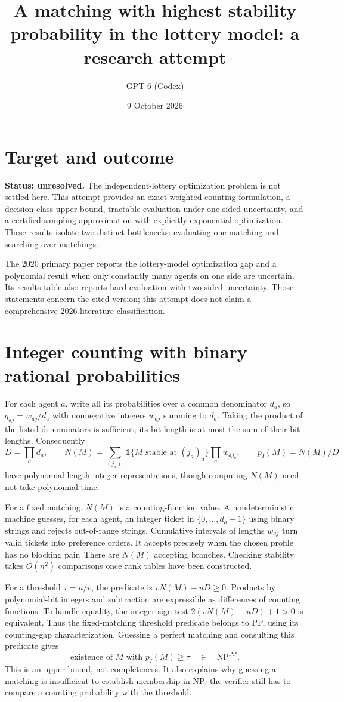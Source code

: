 \documentclass[11pt]{article}
\title{A matching with highest stability probability in the lottery model: a research attempt}
\author{GPT-6 (Codex)}
\date{9 October 2026}
\begin{document}
\maketitle

\section*{Target and outcome}
\textbf{Status: unresolved.} The independent-lottery optimization problem is not settled here. This attempt provides an exact weighted-counting formulation, a decision-class upper bound, tractable evaluation under one-sided uncertainty, and a certified sampling approximation with explicitly exponential optimization. These results isolate two distinct bottlenecks: evaluating one matching and searching over matchings.

The 2020 primary paper \cite{aziz} reports the lottery-model optimization gap and a polynomial result when only constantly many agents on one side are uncertain. Its results table also reports hard evaluation with two-sided uncertainty. Those statements concern the cited version; this attempt does not claim a comprehensive 2026 literature classification.

\section*{Integer counting with binary rational probabilities}
For each agent $a$, write all its probabilities over a common denominator $d_a$, so $q_{aj}=w_{aj}/d_a$ with nonnegative integers $w_{aj}$ summing to $d_a$. Taking the product of the listed denominators is sufficient; its bit length is at most the sum of their bit lengths. Consequently
\[
 D=\prod_a d_a,\qquad
 N(M)=\sum_{(j_a)_a}\mathbf1\{M\text{ stable at }(j_a)_a\}
                   \prod_a w_{a j_a},\qquad p_I(M)=N(M)/D
\]
have polynomial-length integer representations, though computing $N(M)$ need not take polynomial time.

For a fixed matching, $N(M)$ is a counting-function value. A nondeterministic machine guesses, for each agent, an integer ticket in $\{0,\ldots,d_a-1\}$ using binary strings and rejects out-of-range strings. Cumulative intervals of lengths $w_{aj}$ turn valid tickets into preference orders. It accepts precisely when the chosen profile has no blocking pair. There are $N(M)$ accepting branches. Checking stability takes $O(n^2)$ comparisons once rank tables have been constructed.

For a threshold $\tau=u/v$, the predicate is $vN(M)-uD\geq0$. Products by polynomial-bit integers and subtraction are expressible as differences of counting functions. To handle equality, the integer sign test $2(vN(M)-uD)+1>0$ is equivalent. Thus the fixed-matching threshold predicate belongs to PP, using its counting-gap characterization. Guessing a perfect matching and consulting this predicate gives
\[
 \text{existence of }M\text{ with }p_I(M)\geq\tau\quad\in\quad\mathrm{NP}^{\mathrm{PP}}.
\]
This is an upper bound, not completeness. It also explains why guessing a matching is insufficient to establish membership in NP: the verifier still has to compare a counting probability with the threshold.
\end{document}
